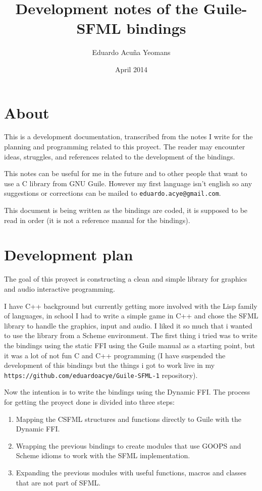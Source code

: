 \documentclass[latterpaper, leqno]{article}
\title{Development notes of the Guile-SFML bindings}
\author{Eduardo Acuña Yeomans}
\date{April 2014}
\begin{document}
\maketitle

\section*{About}
This is a development documentation, transcribed from the notes I write for the planning and programming related to this proyect. The reader may encounter ideas, struggles, and references related to the development of the bindings.

This notes can be useful for me in the future and to other people that want to use a C library from GNU Guile. However my first language isn't english so any suggestions or corrections can be mailed to \texttt{eduardo.acye@gmail.com}.

This document is being written as the bindings are coded, it is supposed to be read in order (it is not a reference manual for the bindings).

\section*{Development plan}
The goal of this proyect is constructing a clean and simple library for graphics and audio interactive programming.

I have C++ background but currently getting more involved with the Lisp family of languages, in school I had to write a simple game in C++ and chose the SFML library to handle the graphics, input and audio. I liked it so much that i wanted to use the library from a Scheme environment. The first thing i tried was to write the bindings using the static FFI using the Guile manual as a starting point, but it was a lot of not fun C and C++ programming (I have suspended the development of this bindings but the things i got to work live in my \texttt{https://github.com/eduardoacye/Guile-SFML-1} repository).

Now the intention is to write the bindings using the Dynamic FFI. The process for getting the proyect done is divided into three steps:

\begin{enumerate}
\item Mapping the CSFML structures and functions directly to Guile with the Dynamic FFI.
\item Wrapping the previous bindings to create modules that use GOOPS and Scheme idioms to work with the SFML implementation.
\item Expanding the previous modules with useful functions, macros and classes that are not part of SFML.
\end{enumerate}
\end{document}
